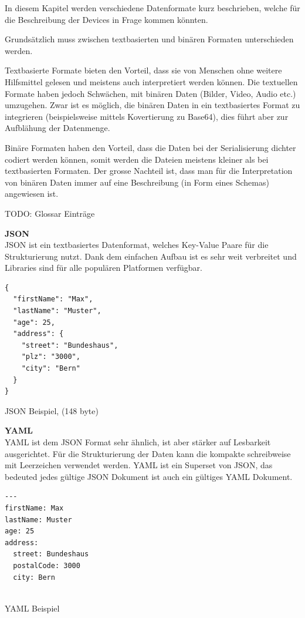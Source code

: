 In diesem Kapitel werden verschiedene Datenformate kurz beschrieben, welche für die Beschreibung der Devices in Frage kommen könnten. 

Grundsätzlich muss zwischen textbasierten und binären Formaten unterschieden werden.

Textbasierte Formate bieten den Vorteil, dass sie von Menschen ohne weitere Hilfsmittel gelesen und meistens auch interpretiert werden können. Die textuellen Formate haben jedoch Schwächen, mit binären Daten (Bilder, Video, Audio etc.) umzugehen. Zwar ist es möglich, die binären Daten in ein textbasiertes Format zu integrieren (beispielsweise mittels Kovertierung zu Base64), dies führt aber zur Aufblähung der Datenmenge.

Binäre Formaten haben den Vorteil, dass die Daten bei der Serialisierung dichter codiert werden können, somit werden die Dateien meistens kleiner als bei textbasierten Formaten. Der grosse Nachteil ist, dass man für die Interpretation von binären Daten immer auf eine Beschreibung (in Form eines Schemas) angewiesen ist.

TODO: Glossar Einträge

\textbf{JSON} \\
JSON ist ein textbasiertes Datenformat, welches Key-Value Paare für die Strukturierung nutzt. Dank dem einfachen Aufbau ist es sehr weit verbreitet und Libraries sind für alle populären Platformen verfügbar.

\begin{listing}[H]
\begin{verbatim}
{
  "firstName": "Max",
  "lastName": "Muster",
  "age": 25,
  "address": {
    "street": "Bundeshaus",
    "plz": "3000",
    "city": "Bern"
  }
}

\end{verbatim}
\caption{JSON Beispiel, (148 byte)}
\end{listing}


\textbf{YAML} \\ 
YAML ist dem JSON Format sehr ähnlich, ist aber stärker auf Lesbarkeit ausgerichtet. Für die Strukturierung der Daten kann die kompakte schreibweise mit Leerzeichen verwendet werden. 
YAML ist ein Superset von JSON, das bedeuted jedes gültige JSON Dokument ist auch ein gültiges YAML Dokument.

\begin{listing}[H]
\begin{verbatim}
---
firstName: Max
lastName: Muster
age: 25
address: 
  street: Bundeshaus
  postalCode: 3000
  city: Bern


\end{verbatim}
\caption{YAML Beispiel}
\end{listing}

